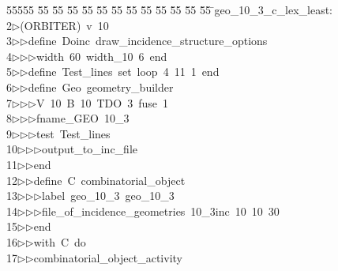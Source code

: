 %
%
\begin{tabbing}
55555 \= 55 \= 55 \= 55 \= 55 \= 55 \= 55 \= 55 \= 55 \= 55 \= 55 \= 55 \= 55 \= \>geo\_10\_3\_c\_lex\_least:\\[0pt]
2\>$\triangleright$\>(ORBITER)\ v\ 10\ \\[0pt]
3\>$\triangleright$\>$\triangleright$\>define\ Doinc\ draw\_incidence\_structure\_options\ \\[0pt]
4\>$\triangleright$\>$\triangleright$\>$\triangleright$\>width\ 60\ width\_10\ 6\ end\ \\[0pt]
5\>$\triangleright$\>$\triangleright$\>define\ Test\_lines\ set\ loop\ 4\ 11\ 1\ end\ \\[0pt]
6\>$\triangleright$\>$\triangleright$\>define\ Geo\ geometry\_builder\ \\[0pt]
7\>$\triangleright$\>$\triangleright$\>$\triangleright$\>V\ 10\ B\ 10\ TDO\ 3\ fuse\ 1\ \\[0pt]
8\>$\triangleright$\>$\triangleright$\>$\triangleright$\>fname\_GEO\ 10\_3\ \\[0pt]
9\>$\triangleright$\>$\triangleright$\>$\triangleright$\>test\ Test\_lines\ \\[0pt]
10\>$\triangleright$\>$\triangleright$\>$\triangleright$\>output\_to\_inc\_file\ \\[0pt]
11\>$\triangleright$\>$\triangleright$\>end\ \\[0pt]
12\>$\triangleright$\>$\triangleright$\>define\ C\ combinatorial\_object\ \\[0pt]
13\>$\triangleright$\>$\triangleright$\>$\triangleright$\>label\ geo\_10\_3\ geo\_10\_3\ \\[0pt]
14\>$\triangleright$\>$\triangleright$\>$\triangleright$\>file\_of\_incidence\_geometries\ 10\_3inc\ 10\ 10\ 30\ \\[0pt]
15\>$\triangleright$\>$\triangleright$\>end\ \\[0pt]
16\>$\triangleright$\>$\triangleright$\>with\ C\ do\ \\[0pt]
17\>$\triangleright$\>$\triangleright$\>combinatorial\_object\_activity\ \\[0pt]

\end{tabbing}
